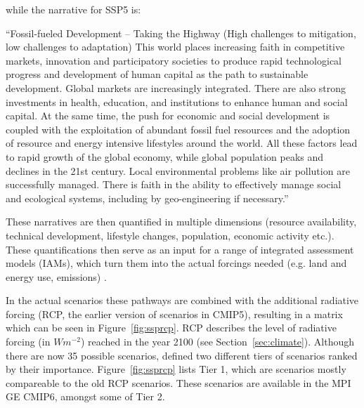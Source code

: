 while the narrative for SSP5 is:

\begin{center}
  \enquote{Fossil-fueled Development – Taking the Highway (High challenges to mitigation, low challenges to adaptation) This world places increasing faith in competitive markets, innovation and participatory societies to produce rapid technological progress and development of human capital as the path to sustainable development. Global markets are increasingly integrated. There are also strong investments in health, education, and institutions to enhance human and social capital. At the same time, the push for economic and social development is coupled with the exploitation of abundant fossil fuel resources and the adoption of resource and energy intensive lifestyles around the world. All these factors lead to rapid growth of the global economy, while global population peaks and declines in the 21st century. Local environmental problems like air pollution are successfully managed. There is faith in the ability to effectively manage social and ecological systems, including by geo-engineering if necessary.} \cite{riahi_shared_2017}
\end{center}

These narratives are then quantified in multiple dimensions (resource availability, technical development, lifestyle changes, population, economic activity etc.). 
These quantifications then serve as an input for a range of integrated assessment models (IAMs), which turn them into the actual forcings needed (e.g. land and energy use, emissions) \cite{riahi_shared_2017}. 

In the actual scenarios these pathways are combined with the additional radiative forcing (RCP, the earlier version of scenarios in CMIP5), resulting in a matrix which can be seen in Figure~\ref{fig:ssprcp}. 
RCP describes the level of radiative forcing (in $Wm^{-2}$) reached in the year 2100 (see Section~\ref{sec:climate}).
Although there are now 35 possible scenarios, \citeauthor{oneill_scenario_2016} defined two different tiers of scenarios ranked by their importance. 
Figure~\ref{fig:ssprcp} lists Tier 1, which are scenarios mostly compareable to the old RCP scenarios. 
These scenarios are available in the MPI GE CMIP6, amongst some of Tier 2. \cite{oneill_scenario_2016, riahi_shared_2017, bottinger_michael_ssp_nodate}


